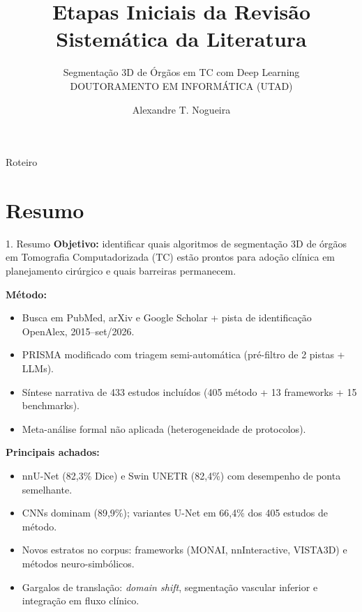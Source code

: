 \documentclass[aspectratio=169]{beamer}
\title[Revisão Sistemática]{Etapas Iniciais da Revisão Sistemática da Literatura}
\subtitle{Segmentação 3D de Órgãos em TC com Deep Learning\\DOUTORAMENTO EM INFORMÁTICA (UTAD)}
\author{Alexandre T. Nogueira}
\date{}
\begin{document}
\begin{frame}
\titlepage
\vspace{-1.2em}
\begin{center}
\end{center}
\end{frame}

\begin{frame}{Roteiro}
	\tableofcontents[hideallsubsections]
\end{frame}

\section{Resumo}
\begin{frame}{1. Resumo}
\small
\textbf{Objetivo:} identificar quais algoritmos de segmentação 3D de órgãos em Tomografia Computadorizada (TC) estão prontos para adoção clínica em planejamento cirúrgico e quais barreiras permanecem.

\vspace{0.4em}
\textbf{Método:}
\begin{itemize}
	\item Busca em PubMed, arXiv e Google Scholar + pista de identificação OpenAlex, 2015--set/2026.
	\item PRISMA modificado com triagem semi-automática (pré-filtro de 2 pistas + LLMs).
	\item Síntese narrativa de 433 estudos incluídos (405 método + 13 frameworks + 15 benchmarks).
	\item Meta-análise formal não aplicada (heterogeneidade de protocolos).
\end{itemize}

\textbf{Principais achados:}
\begin{itemize}
	\item nnU-Net (82,3\% Dice) e Swin UNETR (82,4\%) com desempenho de ponta semelhante.
	\item CNNs dominam (89,9\%); variantes U-Net em 66,4\% dos 405 estudos de método.
	\item Novos estratos no corpus: frameworks (MONAI, nnInteractive, VISTA3D) e métodos neuro-simbólicos.
	\item Gargalos de translação: \textit{domain shift}, segmentação vascular inferior e integração em fluxo clínico.
\end{itemize}
\end{frame}
\end{document}
